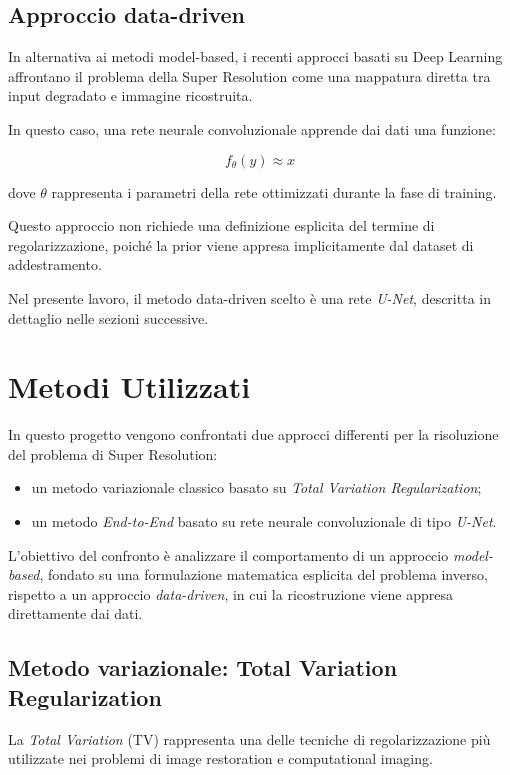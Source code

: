\documentclass{article}
\begin{document}
\subsection{Approccio data-driven}

In alternativa ai metodi model-based, i recenti approcci basati su Deep Learning affrontano il problema della Super Resolution come una mappatura diretta tra input degradato e immagine ricostruita.

In questo caso, una rete neurale convoluzionale apprende dai dati una funzione:

\[
f_{\theta}(y) \approx x
\]

dove \(\theta\) rappresenta i parametri della rete ottimizzati durante la fase di training.

Questo approccio non richiede una definizione esplicita del termine di regolarizzazione, poiché la prior viene appresa implicitamente dal dataset di addestramento.

Nel presente lavoro, il metodo data-driven scelto è una rete \textit{U-Net}, descritta in dettaglio nelle sezioni successive.

\newpage
\section{Metodi Utilizzati}

In questo progetto vengono confrontati due approcci differenti per la risoluzione del problema di Super Resolution:

\begin{itemize}
    \item un metodo variazionale classico basato su \textit{Total Variation Regularization};
    \item un metodo \textit{End-to-End} basato su rete neurale convoluzionale di tipo \textit{U-Net}.
\end{itemize}

L’obiettivo del confronto è analizzare il comportamento di un approccio \textit{model-based}, fondato su una formulazione matematica esplicita del problema inverso, rispetto a un approccio \textit{data-driven}, in cui la ricostruzione viene appresa direttamente dai dati.

\subsection{Metodo variazionale: Total Variation Regularization}

La \textit{Total Variation} (TV) rappresenta una delle tecniche di regolarizzazione più utilizzate nei problemi di image restoration e computational imaging.
\end{document}
